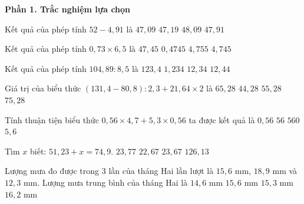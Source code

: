 \textbf{Phần 1. Trắc nghiệm lựa chọn}

\begin{ex} %
Kết quả của phép tính $52 - 4{,}91$ là
\choice
{\True $47{,}09$}
{$47{,}19$}
{$48{,}09$}
{$47{,}91$}
\end{ex}

\begin{ex} %
Kết quả của phép tính $0{,}73 \times 6{,}5$ là
\choice
{$47{,}45$}
{$0{,}4745$}
{$4{,}755$}
{\True $4{,}745$}
\end{ex}

\begin{ex} %
Kết quả của phép tính $104{,}89 : 8{,}5$ là
\choice
{$123{,}4$}
{$1{,}234$}
{\True $12{,}34$}
{$12{,}44$}
\end{ex}

\begin{ex} %
Giá trị của biểu thức $(131{,}4 - 80{,}8) : 2{,}3 + 21{,}64 \times 2$ là
\choice
{\True $65{,}28$}
{$44{,}28$}
{$55{,}28$}
{$75{,}28$}
\end{ex}

\begin{ex} %
Tính thuận tiện biểu thức $0{,}56 \times 4{,}7 + 5{,}3 \times 0{,}56$ ta được kết quả là
\choice
{$0{,}56$}
{$56$}
{$560$}
{\True $5{,}6$}
\end{ex}

\begin{ex} %
Tìm $x$ biết: $51{,}23 + x = 74{,}9$.
\choice
{$23{,}77$}
{$22{,}67$}
{\True $23{,}67$}
{$126{,}13$}
\end{ex}

\begin{ex} %
Lượng mưa đo được trong $3$ lần của tháng Hai lần lượt là $15{,}6\text{ mm}$, $18{,}9\text{ mm}$ và $12{,}3\text{ mm}$. Lượng mưa trung bình của tháng Hai là
\choice
{$14{,}6\text{ mm}$}
{\True $15{,}6\text{ mm}$}
{$15{,}3\text{ mm}$}
{$16{,}2\text{ mm}$}
\end{ex}

